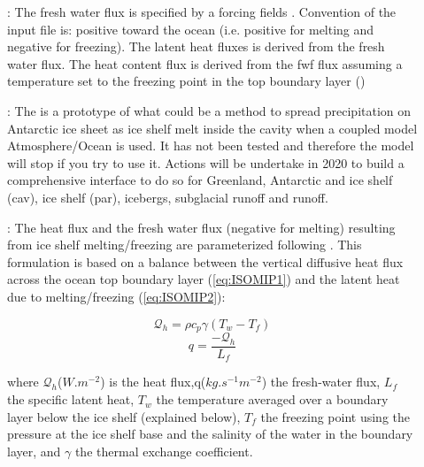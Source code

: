 \documentclass[../main/NEMO_manual]{subfiles}
\begin{document}
     \begin{description}
        \item[]:
        The fresh water flux is specified by a forcing fields . Convention of the input file is: positive toward the ocean (i.e. positive for melting and negative for freezing).
        The latent heat fluxes is derived from the fresh water flux. 
        The heat content flux is derived from the fwf flux assuming a temperature set to the freezing point in the top boundary layer ()

        \item[]:
        The  is a prototype of what could be a method to spread precipitation on Antarctic ice sheet as ice shelf melt inside the cavity when a coupled model Atmosphere/Ocean is used. 
        It has not been tested and therefore the model will stop if you try to use it. 
        Actions will be undertake in 2020 to build a comprehensive interface to do so for Greenland, Antarctic and ice shelf (cav), ice shelf (par), icebergs, subglacial runoff and runoff.

        \item[]:
        The heat flux and the fresh water flux (negative for melting) resulting from ice shelf melting/freezing are parameterized following \citet{Grosfeld1997}. 
        This formulation is based on a balance between the vertical diffusive heat flux across the ocean top boundary layer (\autoref{eq:ISOMIP1}) 
        and the latent heat due to melting/freezing (\autoref{eq:ISOMIP2}):

        \begin{equation}
        \label{eq:ISOMIP1}
        \mathcal{Q}_h = \rho c_p \gamma (T_w - T_f)
        \end{equation}
        \begin{equation}
        \label{eq:ISOMIP2}
        q = \frac{-\mathcal{Q}_h}{L_f}
        \end{equation}
        
        where $\mathcal{Q}_h$($W.m^{-2}$) is the heat flux,q($kg.s^{-1}m^{-2}$) the fresh-water flux, 
        $L_f$ the specific latent heat, $T_w$ the temperature averaged over a boundary layer below the ice shelf (explained below), 
        $T_f$ the freezing point using  the  pressure  at  the  ice  shelf  base  and  the  salinity  of the water in the boundary layer, 
        and $\gamma$ the thermal exchange coefficient.


\end{description}
\end{document}
